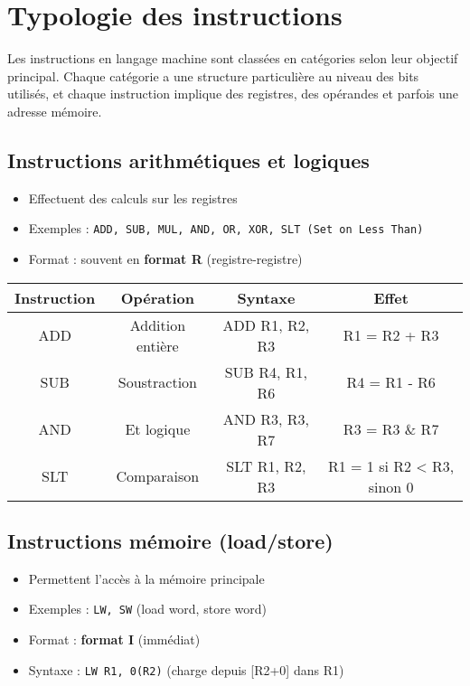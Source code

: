 \documentclass[12pt,a4paper]{article}
\begin{document}
\section{Typologie des instructions}
Les instructions en langage machine sont classées en catégories selon leur objectif principal. Chaque catégorie a une structure particulière au niveau des bits utilisés, et chaque instruction implique des registres, des opérandes et parfois une adresse mémoire.

\subsection{Instructions arithmétiques et logiques}
\begin{itemize}
  \item Effectuent des calculs sur les registres
  \item Exemples : \texttt{ADD, SUB, MUL, AND, OR, XOR, SLT (Set on Less Than)}
  \item Format : souvent en \textbf{format R} (registre-registre)
\end{itemize}

\begin{tabular}{|c|c|c|c|}
\hline
\textbf{Instruction} & \textbf{Opération} & \textbf{Syntaxe} & \textbf{Effet} \\
\hline
ADD & Addition entière & ADD R1, R2, R3 & R1 = R2 + R3 \\
SUB & Soustraction & SUB R4, R1, R6 & R4 = R1 - R6 \\
AND & Et logique & AND R3, R3, R7 & R3 = R3 \& R7 \\
SLT & Comparaison & SLT R1, R2, R3 & R1 = 1 si R2 < R3, sinon 0 \\
\hline
\end{tabular}

\subsection{Instructions mémoire (load/store)}
\begin{itemize}
  \item Permettent l’accès à la mémoire principale
  \item Exemples : \texttt{LW, SW} (load word, store word)
  \item Format : \textbf{format I} (immédiat)
  \item Syntaxe : \texttt{LW R1, 0(R2)} (charge depuis [R2+0] dans R1)
\end{itemize}
\end{document}
